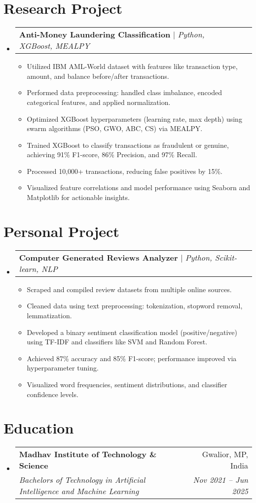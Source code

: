 \documentclass[letterpaper,11pt]{article}
\makeatletter
\newcommand{\resumeItem}[1]{
  \item\small{
    {#1 \vspace{-2pt}}
  }
}
\newcommand{\resumeSubheading}[4]{
  \vspace{-2pt}\item
    \begin{tabular*}{0.97\textwidth}[t]{l@{\extracolsep{\fill}}r}
      \textbf{#1} & #2 \\
      \textit{\small#3} & \textit{\small #4} \\
    \end{tabular*}\vspace{-7pt}
}
\newcommand{\resumeProjectHeading}[2]{
    \item
    \begin{tabular*}{0.97\textwidth}{l@{\extracolsep{\fill}}r}
      \small#1 & #2 \\
    \end{tabular*}\vspace{-7pt}
}
\newcommand{\resumeSubHeadingListStart}{\begin{itemize}[leftmargin=0.15in, label={}]}
\newcommand{\resumeSubHeadingListEnd}{\end{itemize}}
\newcommand{\resumeItemListStart}{\begin{itemize}}
\newcommand{\resumeItemListEnd}{\end{itemize}\vspace{-5pt}}
\makeatother
\begin{document}
\section{Research Project}

\resumeSubHeadingListStart
  \resumeProjectHeading
    {\textbf{Anti-Money Laundering Classification} $|$ \emph{Python, XGBoost, MEALPY}}{}
    \resumeItemListStart
      \resumeItem{Utilized IBM AML-World dataset with features like transaction type, amount, and balance before/after transactions.}
      \resumeItem{Performed data preprocessing: handled class imbalance, encoded categorical features, and applied normalization.}
      \resumeItem{Optimized XGBoost hyperparameters (learning rate, max depth) using swarm algorithms (PSO, GWO, ABC, CS) via MEALPY.}
      \resumeItem{Trained XGBoost to classify transactions as fraudulent or genuine, achieving 91\% F1-score, 86\% Precision, and 97\% Recall.}
      \resumeItem{Processed 10,000+ transactions, reducing false positives by 15\%.}
      \resumeItem{Visualized feature correlations and model performance using Seaborn and Matplotlib for actionable insights.}
    \resumeItemListEnd
\resumeSubHeadingListEnd

\section{Personal Project}

  \resumeSubHeadingListStart
    \resumeProjectHeading
      {\textbf{Computer Generated Reviews Analyzer} $|$ \emph{Python, Scikit-learn, NLP}}{}
      \resumeItemListStart
        \resumeItem{Scraped and compiled review datasets from multiple online sources.}
        \resumeItem{Cleaned data using text preprocessing: tokenization, stopword removal, lemmatization.}
        \resumeItem{Developed a binary sentiment classification model (positive/negative) using TF-IDF and classifiers like SVM and Random Forest.}
        \resumeItem{Achieved 87\% accuracy and 85\% F1-score; performance improved via hyperparameter tuning.}
        \resumeItem{Visualized word frequencies, sentiment distributions, and classifier confidence levels.}
      \resumeItemListEnd
  \resumeSubHeadingListEnd

\section{Education}
  \resumeSubHeadingListStart
    \resumeSubheading
      {Madhav Institute of Technology \& Science}{Gwalior, MP, India}
        {Bachelors of Technology in Artificial Intelligence and Machine Learning}{Nov 2021 -- Jun 2025}
  \resumeSubHeadingListEnd

\end{document}
